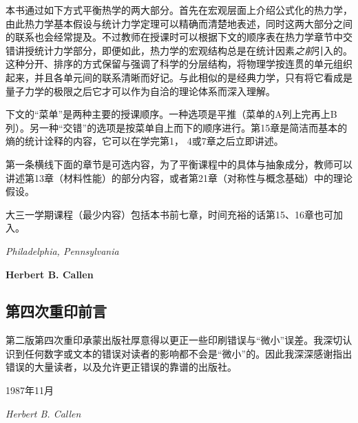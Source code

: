 本书通过如下方式平衡热学的两大部分。首先在宏观层面上介绍公式化的热力学，由此热力学基本假设与统计力学定理可以精确而清楚地表述，同时这两大部分之间的联系也会经常提及。不过教师在授课时可以根据下文的顺序表在热力学章节中交错讲授统计力学部分，即便如此，热力学的宏观结构总是在统计因素{\it 之前}引入的。这种分开、排序的方式保留与强调了科学的分层结构，将物理学按连贯的单元组织起来，并且各单元间的联系清晰而好记。与此相似的是经典力学，只有将它看成是量子力学的极限之后它才可以作为自洽的理论体系而深入理解。

下文的“菜单”是两种主要的授课顺序。一种选项是平推（菜单的A列上完再上B列）。另一种“交错”的选项是按菜单自上而下的顺序进行。第15章是简洁而基本的熵的统计诠释的内容，它可以在学完第1， 4或7章之后立即讲述。

第一条横线下面的章节是可选内容，为了平衡课程中的具体与抽象成分，教师可以讲述第13章（材料性能）的部分内容，或者第21章（对称性与概念基础）中的理论假设。

大三一学期课程（最少内容）包括本书前七章，时间充裕的话第15、16章也可加入。

\begin{flushright}
{\it Philadelphia, Pennsylvania} 

{\bf Herbert B. Callen}
\end{flushright}


\subsection*{第四次重印前言}
第二版第四次重印承蒙出版社厚意得以更正一些印刷错误与“微小”误差。我深切认识到任何数字或文本的错误对读者的影响都不会是“微小”的。因此我深深感谢指出错误的大量读者，以及允许更正错误的靠谱的出版社。

\begin{flushright}
1987年11月

{\it Herbert B. Callen}
\end{flushright}



